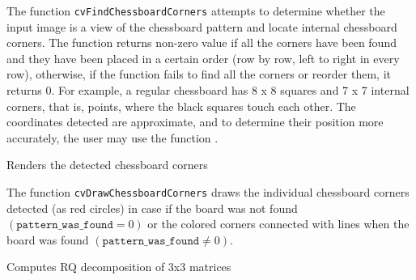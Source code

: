 The function \texttt{cvFindChessboardCorners} attempts to determine
whether the input image is a view of the chessboard pattern and
locate internal chessboard corners. The function returns non-zero
value if all the corners have been found and they have been placed
in a certain order (row by row, left to right in every row),
otherwise, if the function fails to find all the corners or reorder
them, it returns 0. For example, a regular chessboard has 8 x 8
squares and 7 x 7 internal corners, that is, points, where the black
squares touch each other. The coordinates detected are approximate,
and to determine their position more accurately, the user may use
the function .

\label{DrawChessBoardCorners}

Renders the detected chessboard corners


\begin{description}
\end{description}

The function \texttt{cvDrawChessboardCorners} draws the individual chessboard corners detected (as red circles) in case if the board was not found $(\texttt{pattern\_was\_found} =0)$ or the colored corners connected with lines when the board was found $(\texttt{pattern\_was\_found} \ne 0)$.


\label{RQDecomp3x3}

Computes RQ decomposition of 3x3 matrices


